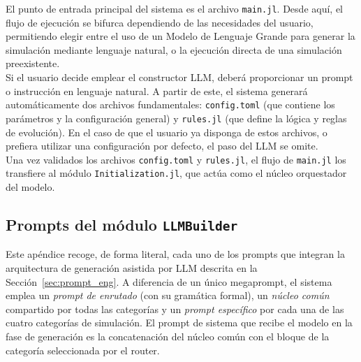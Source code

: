 \documentclass[runningheads]{llncs}
\begin{document}
El punto de entrada principal del sistema es el archivo \texttt{main.jl}. Desde aquí, el flujo de ejecución se bifurca dependiendo de las necesidades del usuario, permitiendo elegir entre el uso de un Modelo de Lenguaje Grande \cite{ref_llm, ref_llm2} para generar la simulación mediante lenguaje natural, o la ejecución directa de una simulación preexistente.\\

Si el usuario decide emplear el constructor LLM, deberá proporcionar un prompt o instrucción en lenguaje natural. A partir de este, el sistema generará automáticamente dos archivos fundamentales: \texttt{config.toml} (que contiene los parámetros y la configuración general) y \texttt{rules.jl} (que define la lógica y reglas de evolución). En el caso de que el usuario ya disponga de estos archivos, o prefiera utilizar una configuración por defecto, el paso del LLM se omite.\\

Una vez validados los archivos \texttt{config.toml} y \texttt{rules.jl}, el flujo de \texttt{main.jl} los transfiere al módulo \texttt{Initialization.jl}, que actúa como el núcleo orquestador del modelo.

\subsection{Prompts del módulo \texttt{LLMBuilder}}
\label{apendice:megaprompt}

Este apéndice recoge, de forma literal, cada uno de los prompts que integran la
arquitectura de generación asistida por LLM descrita en la
Sección~\ref{sec:prompt_eng}. A diferencia de un único megaprompt, el sistema
emplea un \emph{prompt de enrutado} (con su gramática formal), un \emph{núcleo
común} compartido por todas las categorías y un \emph{prompt específico} por
cada una de las cuatro categorías de simulación. El prompt de sistema que recibe
el modelo en la fase de generación es la concatenación del núcleo común con el
bloque de la categoría seleccionada por el router.

\end{document}
